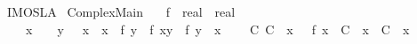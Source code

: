 %
\begin{isabellebody}%
%
%
\isadelimdocument
%
\endisadelimdocument
%
\isatagdocument
%
\isamarkuptrue%
%
\endisatagdocument
{\isafolddocument}%
%
\isadelimdocument
%
\endisadelimdocument
%
\isadelimtheory
%
\endisadelimtheory
%
\isatagtheory
{}\isamarkupfalse%
\ IMO{\isacharunderscore}{}{}{}{}{\isacharunderscore}SL{\isacharunderscore}A{}\isanewline
{}\ Complex{\isacharunderscore}Main\isanewline
{}%
\endisatagtheory
{\isafoldtheory}%
%
\isadelimtheory
\isanewline
%
\endisadelimtheory
\isanewline
{}\isamarkupfalse%
\isanewline
\ \ \ f\ {\isacharcolon}{\isacharcolon}\ {\isachardoublequoteopen}real\ {\isasymRightarrow}\ real{\isachardoublequoteclose}\isanewline
\ \ \ {\isachardoublequoteopen}{\isasymforall}\ x\ {\isachargreater}\ {}{\isachardot}\ {\isasymforall}\ y\ {\isachargreater}\ {}{\isachardot}\ {\isacharparenleft}x\ {\isacharplus}\ {}{\isacharslash}x{\isacharparenright}\ {\isacharasterisk}\ {\isacharparenleft}f\ y{\isacharparenright}\ {\isacharequal}\ f\ {\isacharparenleft}x{\isacharasterisk}y{\isacharparenright}\ {\isacharplus}\ f\ {\isacharparenleft}y\ {\isacharslash}\ x{\isacharparenright}{\isachardoublequoteclose}\isanewline
\ \ \ {\isachardoublequoteopen}{\isasymexists}\ C{}\ C{}{\isachardot}\ {\isasymforall}\ x\ {\isachargreater}\ {}{\isachardot}\ f\ x\ {\isacharequal}\ C{}\ {\isacharasterisk}\ x\ {\isacharplus}\ C{}\ {\isacharslash}\ x{\isachardoublequoteclose}\isanewline
%
\isadelimproof
\ \ %
\endisadelimproof
%
\isatagproof
{}\isamarkupfalse%
%
\endisatagproof
{\isafoldproof}%
%
\isadelimproof
\isanewline
%
\endisadelimproof
%
\isadelimtheory
\isanewline
%
\endisadelimtheory
%
\isatagtheory
{}\isamarkupfalse%
%
\endisatagtheory
{\isafoldtheory}%
%
\isadelimtheory
%
\endisadelimtheory
%
\end{isabellebody}%
\endinput
